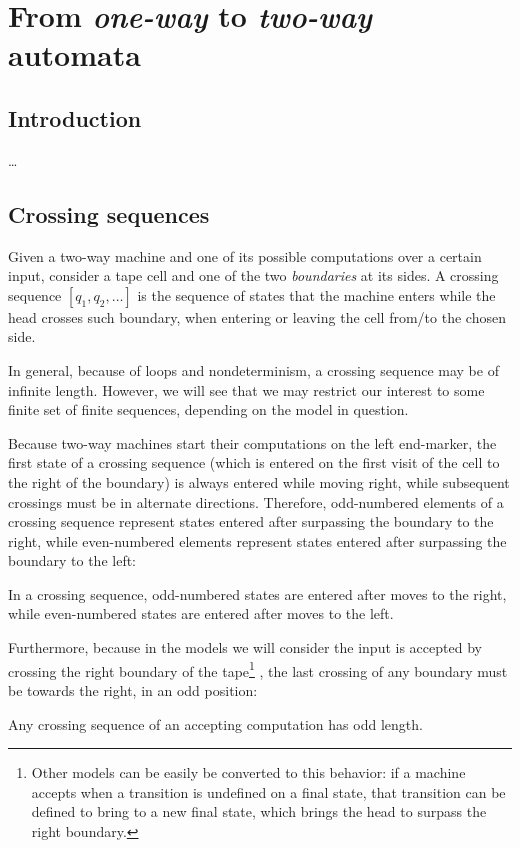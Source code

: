 \chapter{From \emph{one-way} to \emph{two-way} automata}



\section{Introduction}
\dots


\section{Crossing sequences}
Given a two-way machine and one of its possible computations over a certain input, consider a tape cell and one of the two \emph{boundaries} at its sides.
A crossing sequence $[q_1,q_2,\dots]$ is the sequence of states that the machine enters while the head crosses such boundary, \ie when entering or leaving the cell from/to the chosen side.

In general, because of loops and nondeterminism, a crossing sequence may be of infinite length.
However, we will see that we may restrict our interest to some finite set of finite sequences, depending on the model in question.

Because two-way machines start their computations on the left end-marker, the first state of a crossing sequence (which is entered on the first visit of the cell to the right of the boundary) is always entered while moving right, while subsequent crossings must be in alternate directions.
Therefore, odd-numbered elements of a crossing sequence represent states entered after surpassing the boundary to the right, while even-numbered elements represent states entered after surpassing the boundary to the left:
\begin{fact}\label{fact:crossing-parity}
	In a crossing sequence, odd-numbered states are entered after moves to the right, while even-numbered states are entered after moves to the left.
\end{fact}

Furthermore, because in the models we will consider the input is accepted by crossing the right boundary of the tape\footnote{%
Other models can be easily be converted to this behavior: if a machine accepts when a transition is undefined on a final state, that transition can be defined to bring to a new final state, which brings the head to surpass the right boundary.}%
, the last crossing of any boundary must be towards the right, \ie in an odd position:
\begin{fact}\label{fact:crossing-length}
	Any crossing sequence of an accepting computation has odd length.
\end{fact}


